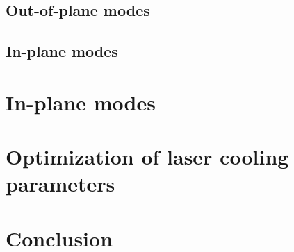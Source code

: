 \documentclass[aps, pra, preprint]{revtex4-1}
\begin{document}
\subsection{Out-of-plane modes}

\subsection{In-plane modes}


\section{In-plane modes}
\label{sec:inplanemodes}


\section{Optimization of laser cooling parameters}
\label{sec:optimization}


\section{Conclusion}
\label{sec:conclusion}


\end{document}
